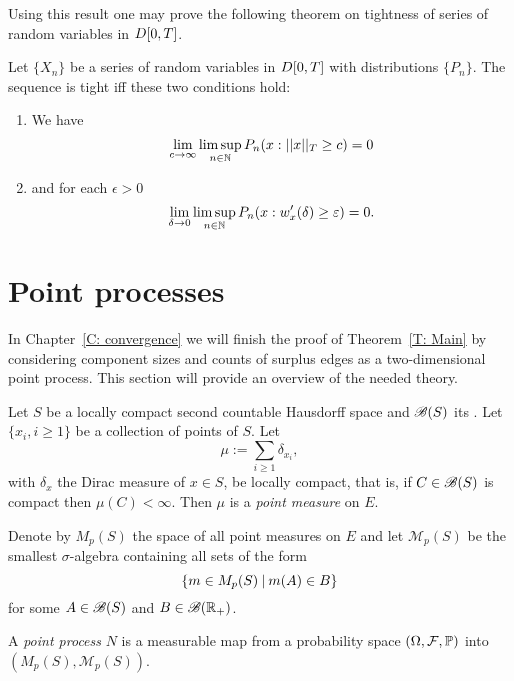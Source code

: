 Using this result one may prove the following theorem on tightness of series of random variables in $D[0, T]$.

\begin{theorem} \label{T: tightness in DT}
	Let $\{X_n\}$ be a series of random variables in $D[0, T]$ with distributions $\{P_n\}$.
	The sequence is tight iff these two conditions hold:
	\begin{enumerate}
		\item We have
		\begin{equation}
		\lim_{c \rightarrow \infty} \limsup_{n \in \mathbb{N}}P_n(x: ||x||_T \geq c) = 0	
		\end{equation}
		\item and for each $\epsilon > 0$
		\begin{equation}
			\lim_{\delta \rightarrow 0} \limsup_{n \in \mathbb{N}}P_n(x: w'_x(\delta) \geq \varepsilon ) = 0.
		\end{equation}
	\end{enumerate}
\end{theorem}


\section{Point processes} \label{S: point processes}

In Chapter~\ref{C: convergence} we will finish the proof of Theorem~\ref{T: Main}
by considering component sizes and counts of surplus edges as a two-dimensional point process.
This section will provide an overview of the needed theory.

\begin{definition} \label{D: point process}
	Let $S$ be a locally compact second countable Hausdorff space
	and $\mathscr{B}(S)$ its \Bosi.
	Let $\{x_i, i \geq 1\}$ be a collection of points of $S$.
	Let
	\begin{equation}
		\mu := \sum_{i \geq 1} \delta_{x_i},
	\end{equation}
	with $\delta_x$ the Dirac measure of $x \in S$,
	be locally compact, that is, 
	if $C \in \mathscr{B}(S)$ is compact then $\mu(C) < \infty$.
	Then $\mu$ is a \emph{point measure} on $E$.
	
	Denote by $M_p(S)$ the space of all point measures on $E$
	and let $\mathscr{M}_p(S)$ be the smallest $\sigma$-algebra containing all sets of the form
	\begin{equation*}
		\{ m \in M_p(S) \: | \: m(A) \in B \}
	\end{equation*}
	for some $A \in \mathscr{B}(S)$ and $B \in \mathscr{B}(\mathbb{R}_+)$.
	
	A \emph{point process} $N$ is a measurable map from a probability space
	$(\Omega, \mathcal{F}, \mathbb{P})$ into $(M_p(S), \mathscr{M}_p(S))$.
\end{definition}

